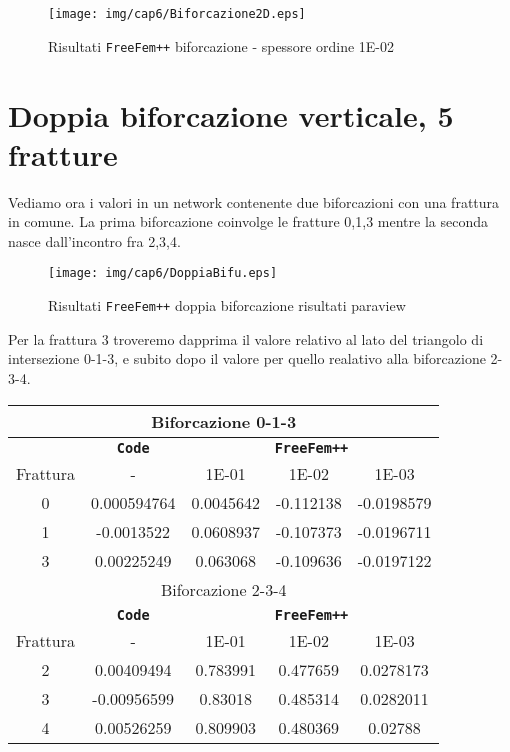 \begin{figure}[h!]
\centering
\texttt{[image: img/cap6/Biforcazione2D.eps]}
\caption{Risultati \texttt{FreeFem++} biforcazione - spessore ordine 1E-02 }\label{Biforcazione1E-02}
\end{figure}

\section{Doppia biforcazione verticale, 5 fratture}
Vediamo ora i valori in un network contenente due biforcazioni con una frattura in comune.
La prima biforcazione coinvolge le fratture 0,1,3 mentre la seconda nasce dall'incontro fra 2,3,4.\\

\begin{figure}[h!]
\centering
\texttt{[image: img/cap6/DoppiaBifu.eps]}
\caption{Risultati \texttt{FreeFem++} doppia biforcazione risultati paraview }\label{DoppiaBifuVerticalParaview}
\end{figure}

Per la frattura 3 troveremo dapprima il valore relativo al lato del triangolo di intersezione 0-1-3, e subito dopo il valore per quello realativo alla biforcazione 2-3-4.

\begin{center}
\begin{tabular}{|c|c|c|c|c|}
\hline
\multicolumn{5}{|c|}{Biforcazione 0-1-3}\\
\hline
 & \textbf{\texttt{Code}} & \multicolumn{3}{|c|}{\textbf{\texttt{FreeFem++}}} \\
\hline
\multicolumn{1}{|c|}{Frattura} & - &
\multicolumn{1}{|c|}{1E-01} & 1E-02 & 1E-03 \\
\hline
 0 & 0.000594764 & 0.0045642 & -0.112138 & -0.0198579\\
 1 & -0.0013522 & 0.0608937 & -0.107373 & -0.0196711\\  
 3 & 0.00225249 & 0.063068 & -0.109636 & -0.0197122\\
\hline
\multicolumn{5}{|c|}{Biforcazione 2-3-4}\\
\hline
 & \textbf{\texttt{Code}} & \multicolumn{3}{|c|}{\textbf{\texttt{FreeFem++}}} \\
\hline
\multicolumn{1}{|c|}{Frattura} & - &
\multicolumn{1}{|c|}{1E-01} & 1E-02 & 1E-03 \\
\hline
 2 & 0.00409494 & 0.783991 & 0.477659 & 0.0278173\\ 
 3 & -0.00956599 & 0.83018 & 0.485314 & 0.0282011\\
 4 & 0.00526259 & 0.809903 & 0.480369 & 0.02788\\
\hline
\end{tabular}
\end{center}

